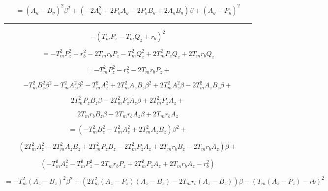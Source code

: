 \documentclass{article}
\begin{document}
\begin{equation*}
= (A_y - B_y)^2\beta^2 +
  (-2A_y^2 + 2P_yA_y - 2P_yB_y + 2A_yB_y)\beta +
  (A_y - P_y)^2
\end{equation*}

\rule{\textwidth}{1pt}

\begin{equation*}
-(T_mP_z - T_mQ_z + r_b)^2
\end{equation*}

\begin{equation*}
= -T_m^2P_z^2 - r_b^2 - 2T_mr_bP_z - T_m^2Q_z^2 + 2T_m^2P_zQ_z + 2T_mr_bQ_z
\end{equation*}

\begin{equation*}
= -T_m^2P_z^2 - r_b^2 - 2T_mr_bP_z +
\end{equation*}

\begin{equation*}
  -T_m^2B_z^2\beta^2
  -T_m^2A_z^2\beta^2
  -T_m^2A_z^2
  +2T_m^2A_zB_z\beta^2
  +2T_m^2A_z^2\beta
  -2T_m^2A_zB_z\beta +
\end{equation*}

\begin{equation*}
  2T_m^2P_zB_z\beta
  -2T_m^2P_zA_z\beta
  +2T_m^2P_zA_z +
\end{equation*}

\begin{equation*}
  2T_mr_bB_z\beta
  -2T_mr_bA_z\beta
  +2T_mr_bA_z
\end{equation*}

\begin{equation*}
=(
 -T_m^2B_z^2
 -T_m^2A_z^2
 +2T_m^2A_zB_z
)\beta^2 +
\end{equation*}

\begin{equation*}
(
  2T_m^2A_z^2
  -2T_m^2A_zB_z
  +2T_m^2P_zB_z
  -2T_m^2P_zA_z
  +2T_mr_bB_z
  -2T_mr_bA_z
)\beta +
\end{equation*}

\begin{equation*}
(
  -T_m^2A_z^2
  -T_m^2P_z^2
  -2T_mr_bP_z
  +2T_m^2P_zA_z
  +2T_mr_bA_z
  -r_b^2
)
\end{equation*}

\begin{equation*}
=-T_m^2(A_z - B_z)^2\beta^2 +
(2T_m^2(A_z - P_z)(A_z - B_z) - 2T_mr_b(A_z - B_z))\beta
-(T_m(A_z - P_z) - rb)^2
\end{equation*}
\end{document}
